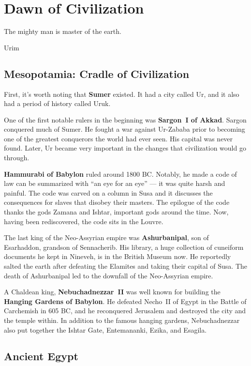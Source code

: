 \chapter{Dawn of Civilization}

\epigraph{%
  The mighty man is master of the earth.
}{Urim}

\section{Mesopotamia: Cradle of Civilization}

First, it's worth noting that \textbf{Sumer} existed.
It had a city called Ur, and it also had a period of history called Uruk.

One of the first notable rulers in the beginning was \textbf{Sargon~I of Akkad}.
Sargon conquered much of Sumer.
He fought a war against Ur-Zababa prior to becoming one of the greatest conquerors the world had ever seen.
His capital was never found.
Later, Ur became very important in the changes that civilization would go through.

\textbf{Hammurabi of Babylon} ruled around 1800 BC\@.
Notably, he made a code of law can be summarized with ``an eye for an eye'' --- it was quite harsh and painful.
The code was carved on a column in Susa and it discusses the consequences for slaves that disobey their masters.
The epilogue of the code thanks the gods Zamana and Ishtar, important gods around the time.
Now, having been rediscovered, the code sits in the Louvre.

The last king of the Neo-Assyrian empire was \textbf{Ashurbanipal}, son of Esarhaddon, grandson of Sennacherib.
His library, a huge collection of cuneiform documents he kept in Nineveh, is in the British Museum now.
He reportedly salted the earth after defeating the Elamites and taking their capital of Susa.
The death of Ashurbanipal led to the downfall of the Neo-Assyrian empire.

A Chaldean king, \textbf{Nebuchadnezzar~II} was well known for building the \textbf{Hanging Gardens of Babylon}.
He defeated Necho~II of Egypt in the Battle of Carchemish in 605 BC,
and he reconquered Jerusalem and destroyed the city and the temple within.
In addition to the famous hanging gardens, Nebuchadnezzar also put together the Ishtar Gate,
Entemananki, Ezika, and Esagila.

\section{Ancient Egypt}

